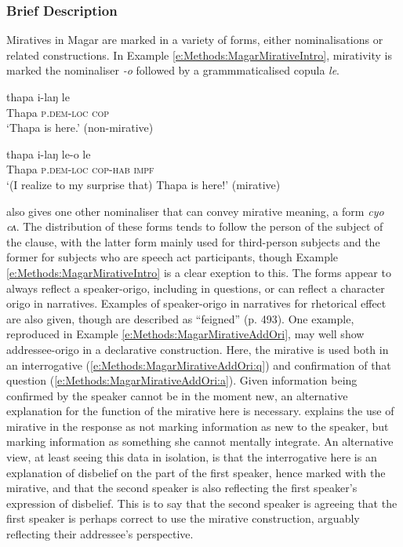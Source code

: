 \subsubsection{Brief Description}
Miratives in Magar are marked in a variety of forms, either nominalisations or related constructions. In Example \ref{e:Methods:MagarMirativeIntro}, mirativity is marked the nominaliser \textit{-o} followed by a grammmaticalised copula \textit{le}. 

\begin{exe}
  \ex\label{e:Methods:MagarMirativeIntro}
  \begin{xlist}
    \ex
    \gll thapa i-laŋ le \\
    Thapa \textsc{p.dem-loc} \textsc{cop} \\
    \glt `Thapa is here.' (non-mirative)

    \ex 
    \gll thapa i-laŋ le-o le \\
    Thapa \textsc{p.dem-loc} \textsc{cop-hab} \textsc{impf} \\
    \glt `(I realize to my surprise that) Thapa is here!' (mirative)
  \end{xlist}
  \cite[Magar,][480]{GrunowHarsta2008}
\end{exe}

 also gives one other nominaliser that can convey mirative meaning, a form \textit{cyo ~ cʌ}. The distribution of these forms tends to follow the person of the subject of the clause, with the latter form mainly used for third-person subjects and the former for subjects who are speech act participants, though Example \ref{e:Methods:MagarMirativeIntro} is a clear exeption to this. The forms appear to always reflect a speaker-origo, including in questions, or can reflect a character origo in narratives. Examples of speaker-origo in narratives for rhetorical effect are also given, though are described as ``feigned'' (p. 493). One example, reproduced in Example \ref{e:Methods:MagarMirativeAddOri}, may well show addressee-origo in a declarative construction. Here, the mirative is used both in an interrogative (\ref{e:Methods:MagarMirativeAddOri:q}) and confirmation of that question (\ref{e:Methods:MagarMirativeAddOri:a}). Given information being confirmed by the speaker cannot be in the moment new, an alternative explanation for the function of the mirative here is necessary.  explains the use of mirative in the response as not marking information as new to the speaker, but marking information as something she cannot mentally integrate. An alternative view, at least seeing this data in isolation, is that the interrogative here is an explanation of disbelief on the part of the first speaker, hence marked with the mirative, and that the second speaker is also reflecting the first speaker's expression of disbelief. This is to say that the second speaker is agreeing that the first speaker is perhaps correct to use the mirative construction, arguably reflecting their addressee's perspective.

